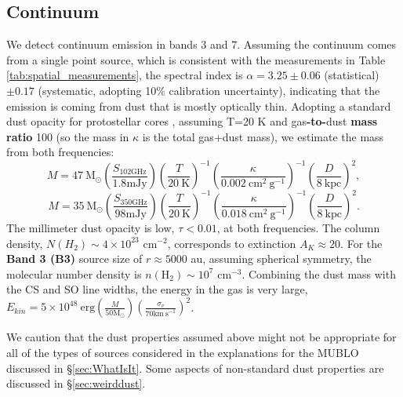 \documentclass[]{aastex631}
\newcommand{\msun}{\ensuremath{\mathrm{M}_\odot}\xspace}
\newcommand{\kms}{\ensuremath{\mathrm{km~s}^{-1}}\xspace}
\newcommand{\percc}{\ensuremath{\mathrm{cm}^{-3}}\xspace}
\newcommand{\persc}{\ensuremath{\mathrm{cm}^{-2}}\xspace}
\def\rr#1{\textbf{#1}}
\begin{document}
\subsection{Continuum}
\label{sec:continuum}
We detect continuum emission in bands 3 and 7.
Assuming the continuum comes from a single point source, which is consistent with the measurements in Table \ref{tab:spatial_measurements}, the spectral index is $\alpha=3.25\pm0.06$ (statistical) $\pm0.17$ (systematic, adopting 10\% calibration uncertainty),  indicating that the emission is coming from dust that is mostly optically thin.
Adopting a standard dust opacity for protostellar cores \citep[$\kappa_\mathrm{100 GHz} = 0.002$ cm$^{2}$ g$^{-1}$ extrapolated from][however, see \S \ref{sec:weirddust}]{Ossenkopf1994}, assuming T=20 K and gas\rr{-to-}dust \rr{mass ratio} 100 (so the mass in $\kappa$ is the total gas+dust mass), we estimate the mass from both frequencies:
\begin{equation}
    M=47~\msun \left(\frac{S_\mathrm{102 GHz}}{1.8 \mathrm{mJy}}\right) \left(\frac{T}{20\mathrm{~K}}\right)^{-1} \left(\frac{\kappa}{0.002\mathrm{~cm^{2}~ g^{-1}}}\right)^{-1} \left(\frac{D}{8 \mathrm{~kpc}}\right)^2,
\end{equation}
\begin{equation}
M=35~\msun \left(\frac{S_\mathrm{350 GHz}}{98 \mathrm{mJy}}\right) \left(\frac{T}{20\mathrm{~K}}\right)^{-1} \left(\frac{\kappa}{0.018\mathrm{~cm^{2}~ g^{-1}}}\right)^{-1} \left(\frac{D}{8 \mathrm{~kpc}}\right)^2.
\end{equation}
The millimeter dust opacity is low, $\tau<0.01$, at both frequencies.
The column density, $N(H_2)\sim4\times10^{23}$ \persc, corresponds to extinction $A_K\approx20$.
For the \rr{Band 3 (B3)} source size of $r\approx5000$ au, assuming spherical symmetry, the molecular number density is $n(\mathrm{H}_2)\sim10^7$ \percc.
Combining the dust mass with the CS and SO line widths, the energy in the gas is very large, $E_{kin} = 5\times10^{48}\mathrm{~erg} \left(\frac{M}{50 \msun}\right) \left(\frac{\sigma_v}{70 \kms}\right)^2$.

We caution that the dust properties assumed above might not be appropriate for all of the types of sources considered in the explanations for the MUBLO discussed in \S\ref{sec:WhatIsIt}.
Some aspects of non-standard dust properties are discussed in \S\ref{sec:weirddust}.
\end{document}
